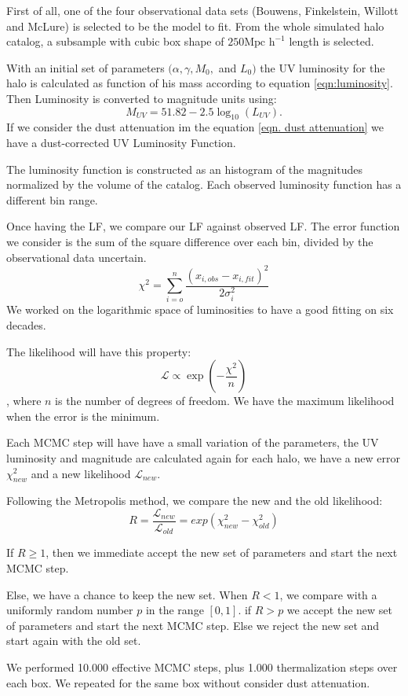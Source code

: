 \documentclass{emulateapj}
\begin{document}
First of all, one of the four observational data sets (Bouwens, Finkelstein, Willott and McLure) 
is selected to be the model to fit.
From the whole simulated halo catalog, a subsample with cubic box shape of 
 $250\textrm{Mpc h}^{-1}$ length is selected. 
 
With an initial set of parameters $(\alpha, \gamma, M_0,$ and $ L_0)$ the UV luminosity
for the halo is calculated as function of his mass according to equation
 \ref{eqn:luminosity}. Then Luminosity is converted to magnitude units using:
  \[ M_{UV} = 51.82 - 2.5 \log_{10}(L_{UV}). \]
If we consider the dust attenuation im the equation \ref{eqn. dust attenuation} we have
a dust-corrected UV Luminosity Function.

The luminosity function is constructed as an histogram of the magnitudes normalized by 
the volume of the catalog. Each observed luminosity function has a different bin range.

Once having the LF, we compare our LF against observed LF. The error function we consider
is the sum of the square difference over each bin, divided by the observational data uncertain.
\[ \chi^2  = \sum_{i=o}^{n} \frac {\left( x_{i,obs} - x_{i,fit} \right)^2 }{2\sigma_i^2}\]
We worked on the logarithmic space of luminosities to have a good fitting on
six decades.

The likelihood will have this property:
\[ \mathcal{L} \propto \exp \left(  -\frac{\chi ^2}{n} \right) \], where $n$ is the number of degrees
of freedom. We have the maximum likelihood when the error is the minimum.

Each MCMC step will have have a small variation of the parameters, the UV luminosity and magnitude are 
calculated again for each halo, we have a new error $\chi_{new}^2$ and a new likelihood 
$ \mathcal{L}_{new} $.

Following the Metropolis method, we compare the new and the old likelihood:
\[ R =\frac{ \mathcal{L}_{new}  }{ \mathcal{L}_{old} }  = 
exp( \chi_{new}^2 - \chi_{old}^2 )
\]

If $  R \geq 1$, then we immediate accept the new set of parameters and start the next MCMC step.

Else, we have a chance to keep the new set. When $ R < 1$, we compare with a uniformly 
random number $p$ in the range $[0,1]$. if $ R>p$ we accept the new set of parameters and start
the next MCMC step. 
Else we reject the new set and start again with the old set.

We performed 10.000 effective MCMC steps, plus 1.000 thermalization steps over each box.
We repeated for the same box without consider dust attenuation.
\end{document}
